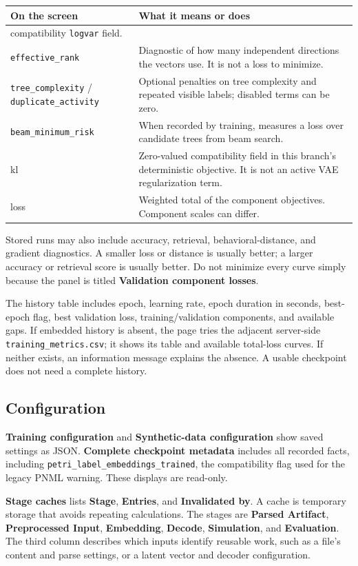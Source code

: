 \documentclass[11pt,a4paper]{article}
\makeatletter
\newcommand{\ui}[1]{\textbf{#1}}
\newcommand{\code}[1]{\nolinkurl{#1}}
\newenvironment{controls}{%
  \small\begin{longtable}{@{}>{\raggedright\arraybackslash}p{.34\linewidth}
    >{\raggedright\arraybackslash}p{.62\linewidth}@{}}
  \toprule\textbf{On the screen} & \textbf{What it means or does}\\\midrule\endhead
  \bottomrule\endfoot
}{\end{longtable}\normalsize}
\makeatother
\begin{document}
\begin{controls}
compatibility \code{logvar} field.\\
\code{effective_rank} & Diagnostic of how many independent directions the
vectors use. It is not a loss to minimize.\\
\code{tree_complexity} / \code{duplicate_activity} & Optional penalties on
tree complexity and repeated visible labels; disabled terms can be zero.\\
\code{beam_minimum_risk} & When recorded by training, measures a loss over
candidate trees from beam search.\\
kl & Zero-valued compatibility field in this branch's deterministic objective.
It is not an active VAE regularization term.\\
loss & Weighted total of the component objectives. Component scales can differ.\\
\end{controls}

Stored runs may also include accuracy, retrieval, behavioral-distance, and
gradient diagnostics. A smaller loss or distance is usually better; a larger
accuracy or retrieval score is usually better. Do not minimize every curve
simply because the panel is titled \ui{Validation component losses}.

The history table includes epoch, learning rate, epoch duration in seconds,
best-epoch flag, best validation loss, training/validation components, and
available gaps. If embedded history is absent, the page tries the adjacent
server-side \code{training_metrics.csv}; it shows its table and available
total-loss curves. If neither exists, an information message explains the
absence. A usable checkpoint does not need a complete history.

\subsection{Configuration}
\ui{Training configuration} and \ui{Synthetic-data configuration} show saved
settings as JSON. \ui{Complete checkpoint metadata} includes all recorded
facts, including \code{petri_label_embeddings_trained}, the compatibility
flag used for the legacy PNML warning. These displays are read-only.

\ui{Stage caches} lists \ui{Stage}, \ui{Entries}, and \ui{Invalidated by}.
A cache is temporary storage that avoids repeating calculations. The stages
are \ui{Parsed Artifact}, \ui{Preprocessed Input}, \ui{Embedding},
\ui{Decode}, \ui{Simulation}, and \ui{Evaluation}. The third column describes
which inputs identify reusable work, such as a file's content and parse
settings, or a latent vector and decoder configuration.
\end{document}
